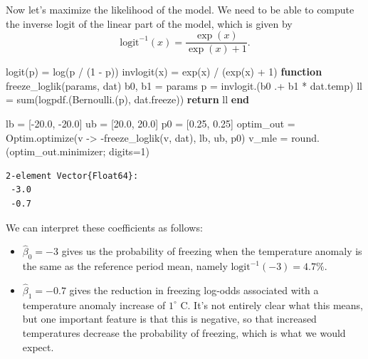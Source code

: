 \documentclass[
  letterpaper,
  DIV=11,
  numbers=noendperiod]{scrartcl}
\newenvironment{Shaded}{\begin{snugshade}}{\end{snugshade}}
\newcommand{\ControlFlowTok}[1]{\textcolor[rgb]{0.00,0.23,0.31}{\textbf{#1}}}
\newcommand{\FloatTok}[1]{\textcolor[rgb]{0.68,0.00,0.00}{#1}}
\newcommand{\FunctionTok}[1]{\textcolor[rgb]{0.28,0.35,0.67}{#1}}
\newcommand{\KeywordTok}[1]{\textcolor[rgb]{0.00,0.23,0.31}{\textbf{#1}}}
\newcommand{\NormalTok}[1]{\textcolor[rgb]{0.00,0.23,0.31}{#1}}
\newcommand{\OperatorTok}[1]{\textcolor[rgb]{0.37,0.37,0.37}{#1}}
\providecommand{\tightlist}{%
  \setlength{\itemsep}{0pt}\setlength{\parskip}{0pt}}
\begin{document}
Now let's maximize the likelihood of the model. We need to be able to
compute the inverse logit of the linear part of the model, which is
given by \[\text{logit}^{-1}(x) = \frac{\exp(x)}{\exp(x) + 1}.\]

\begin{Shaded}
\begin{Highlighting}[]
\FunctionTok{logit}\NormalTok{(p) }\OperatorTok{=} \FunctionTok{log}\NormalTok{(p }\OperatorTok{/}\NormalTok{ (}\FloatTok{1} \OperatorTok{{-}}\NormalTok{ p))}
\FunctionTok{invlogit}\NormalTok{(x) }\OperatorTok{=} \FunctionTok{exp}\NormalTok{(x) }\OperatorTok{/}\NormalTok{ (}\FunctionTok{exp}\NormalTok{(x) }\OperatorTok{+} \FloatTok{1}\NormalTok{)}
\KeywordTok{function} \FunctionTok{freeze\_loglik}\NormalTok{(params, dat)}
\NormalTok{    b0, b1 }\OperatorTok{=}\NormalTok{ params}
\NormalTok{    p }\OperatorTok{=} \FunctionTok{invlogit}\NormalTok{.(b0 }\OperatorTok{.+}\NormalTok{ b1 }\OperatorTok{*}\NormalTok{ dat.temp)}
\NormalTok{    ll }\OperatorTok{=} \FunctionTok{sum}\NormalTok{(}\FunctionTok{logpdf}\NormalTok{.(}\FunctionTok{Bernoulli}\NormalTok{.(p), dat.freeze))}
    \ControlFlowTok{return}\NormalTok{ ll}
\KeywordTok{end}

\NormalTok{lb }\OperatorTok{=}\NormalTok{ [}\OperatorTok{{-}}\FloatTok{20.0}\NormalTok{, }\OperatorTok{{-}}\FloatTok{20.0}\NormalTok{]}
\NormalTok{ub }\OperatorTok{=}\NormalTok{ [}\FloatTok{20.0}\NormalTok{, }\FloatTok{20.0}\NormalTok{]}
\NormalTok{p0 }\OperatorTok{=}\NormalTok{ [}\FloatTok{0.25}\NormalTok{, }\FloatTok{0.25}\NormalTok{]}
\NormalTok{optim\_out }\OperatorTok{=}\NormalTok{ Optim.}\FunctionTok{optimize}\NormalTok{(v }\OperatorTok{{-}\textgreater{}} \FunctionTok{{-}freeze\_loglik}\NormalTok{(v, dat), lb, ub, p0)}
\NormalTok{v\_mle }\OperatorTok{=} \FunctionTok{round}\NormalTok{.(optim\_out.minimizer; digits}\OperatorTok{=}\FloatTok{1}\NormalTok{)}
\end{Highlighting}
\end{Shaded}

\begin{verbatim}
2-element Vector{Float64}:
 -3.0
 -0.7
\end{verbatim}

We can interpret these coefficients as follows:

\begin{itemize}
\tightlist
\item
  \(\hat{\beta}_0 = -3\) gives us the probability of freezing when the
  temperature anomaly is the same as the reference period mean, namely
  \(\text{logit}^{-1}(-3) = 4.7\%\).
\item
  \(\hat{\beta}_1 = -0.7\) gives the reduction in freezing log-odds
  associated with a temperature anomaly increase of \(1^\circ\) C. It's
  not entirely clear what this means, but one important feature is that
  this is negative, so that increased temperatures decrease the
  probability of freezing, which is what we would expect.
\end{itemize}
\end{document}
